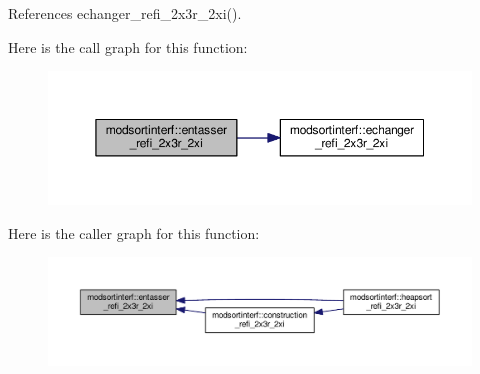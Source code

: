 References echanger\+\_\+refi\+\_\+2x3r\+\_\+2xi().



Here is the call graph for this function\+:\nopagebreak
\begin{figure}[H]
\begin{center}
\leavevmode
\includegraphics[width=350pt]{namespacemodsortinterf_a4c07f7c23233d32c941f288e1863160e_cgraph}
\end{center}
\end{figure}




Here is the caller graph for this function\+:\nopagebreak
\begin{figure}[H]
\begin{center}
\leavevmode
\includegraphics[width=350pt]{namespacemodsortinterf_a4c07f7c23233d32c941f288e1863160e_icgraph}
\end{center}
\end{figure}



